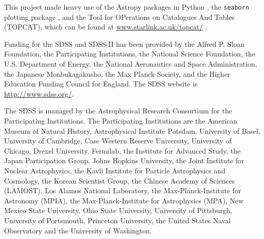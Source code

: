 \documentclass[useAMS,usenatbib]{mn2e}
\begin{document}
This project made heavy use of the Astropy packages in Python \citep{Robitaille2013}, the \texttt{seaborn} plotting package \citep{Waskom}, and the Tool for OPerations on Catalogues And Tables (TOPCAT), which can be found at \url{www.starlink.ac.uk/topcat/} \citep{Taylor2005}. 

Funding for the SDSS and SDSS-II has been provided by the Alfred P. Sloan
Foundation, the Participating Institutions, the National Science Foundation,
the U.S. Department of Energy, the National Aeronautics and Space
Administration, the Japanese Monbukagakusho, the Max Planck Society, and the
Higher Education Funding Council for England. The SDSS website is
\url{http://www.sdss.org/}. 

The SDSS is managed by the Astrophysical Research Consortium for the
Participating Institutions. The Participating Institutions are the American
Museum of Natural History, Astrophysical Institute Potsdam, University of
Basel, University of Cambridge, Case Western Reserve University, University of
Chicago, Drexel University, Fermilab, the Institute for Advanced Study, the
Japan Participation Group, Johns Hopkins University, the Joint Institute for
Nuclear Astrophysics, the Kavli Institute for Particle Astrophysics and
Cosmology, the Korean Scientist Group, the Chinese Academy of Sciences
(LAMOST), Los Alamos National Laboratory, the Max-Planck-Institute for
Astronomy (MPIA), the Max-Planck-Institute for Astrophysics (MPA), New Mexico
State University, Ohio State University, University of Pittsburgh, University
of Portsmouth, Princeton University, the United States Naval Observatory and
the University of Washington. 


  
\end{document}
